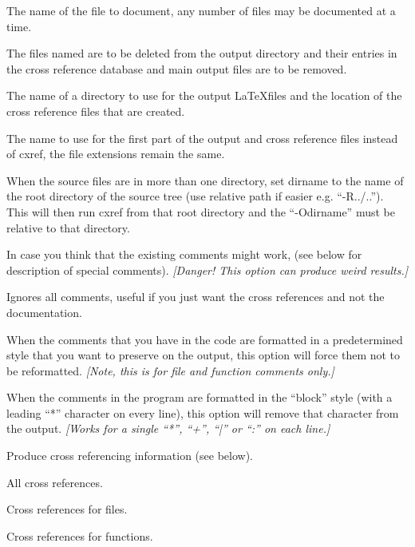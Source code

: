 \documentclass{report}
\begin{document}
\begin{list}{}{\leftmargin=1in }
\item[{\tt filename}]
The name of the file to document, any number of files may be
documented at a time.
\item[{\tt -delete}]
The files named are to be deleted from the output directory and
their entries in the cross reference database and main output
files are to be removed.
\item[{\tt -Odirname}]
The name of a directory to use for the output \LaTeX files and
the location of the cross reference files that are created.
\item[{\tt -Nbasename}]
The name to use for the first part of the output and cross
reference files instead of cxref, the file extensions remain
the same.
\item[{\tt -Rdirname}]
When the source files are in more than one directory, set
dirname to the name of the root directory of the source tree
(use relative path if easier e.g. ``-R../..'').  This will then
run cxref from that root directory and the ``-Odirname'' must be
relative to that directory.
\item[{\tt -all-comments}]
In case you think that the existing comments might work,
(see below for description of special comments).
{\it[Danger! This option can produce weird results.]}
\item[{\tt -no-comments}]
Ignores all comments, useful if you just want the cross
references and not the documentation.
\item[{\tt -verbatim-comments}]
When the comments that you have in the code are formatted
in a predetermined style that you want to preserve on the
output, this option will force them not to be reformatted.
{\it[Note, this is for file and function comments only.]}
\item[{\tt -block-comments}]
When the comments in the program are formatted in the ``block''
style (with a leading ``*'' character on every line), this option
will remove that character from the output.
{\it[Works for a single ``*'', ``+'', ``|'' or ``:'' on each line.]}
\item[{\tt -xref}]
Produce cross referencing information (see below).
\begin{list}{}{\leftmargin=1in }
\item[{\tt -all}]    All cross references.
\item[{\tt -file}]   Cross references for files.
\item[{\tt -func}]   Cross references for functions.

\end{list}
\end{list}
\end{document}
